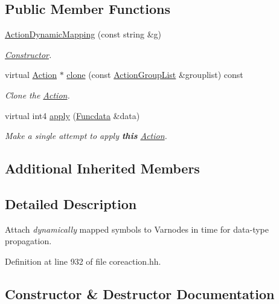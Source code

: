 \subsection*{Public Member Functions}
\begin{DoxyCompactItemize}
\item 
\mbox{\hyperlink{class_action_dynamic_mapping_a630c7f9adb8e6551f2e1fe1ecaf014a3}{Action\+Dynamic\+Mapping}} (const string \&g)
\begin{DoxyCompactList}\small\item\em \mbox{\hyperlink{class_constructor}{Constructor}}. \end{DoxyCompactList}\item 
virtual \mbox{\hyperlink{class_action}{Action}} $\ast$ \mbox{\hyperlink{class_action_dynamic_mapping_a9c1315b992794205be6fc1ae3b419b16}{clone}} (const \mbox{\hyperlink{class_action_group_list}{Action\+Group\+List}} \&grouplist) const
\begin{DoxyCompactList}\small\item\em Clone the \mbox{\hyperlink{class_action}{Action}}. \end{DoxyCompactList}\item 
virtual int4 \mbox{\hyperlink{class_action_dynamic_mapping_a4d91f3a0cca0be4f2600f5deff083cd8}{apply}} (\mbox{\hyperlink{class_funcdata}{Funcdata}} \&data)
\begin{DoxyCompactList}\small\item\em Make a single attempt to apply {\bfseries{this}} \mbox{\hyperlink{class_action}{Action}}. \end{DoxyCompactList}\end{DoxyCompactItemize}
\subsection*{Additional Inherited Members}


\subsection{Detailed Description}
Attach {\itshape dynamically} mapped symbols to Varnodes in time for data-\/type propagation. 

Definition at line 932 of file coreaction.\+hh.



\subsection{Constructor \& Destructor Documentation}
\mbox{\label{class_action_dynamic_mapping_a630c7f9adb8e6551f2e1fe1ecaf014a3}} 
